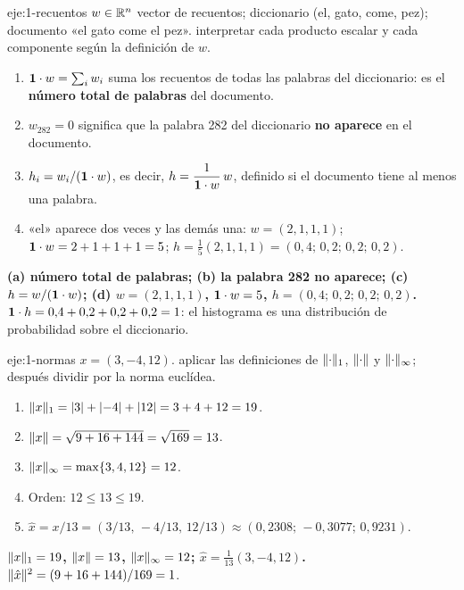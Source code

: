 \begin{solucion}{eje:1-recuentos}
\datos $w\in\mathbb{R}^{n}$ vector de recuentos; diccionario (el, gato, come, pez); documento «el gato come el pez».
\planteamiento interpretar cada producto escalar y cada componente según la definición de $w$.
\pasos
\begin{enumerate}[label=(\alph*)]
  \item $\mathbf{1}\cdot w=\sum_iw_i$ suma los recuentos de todas las palabras del diccionario: es el \textbf{número total de palabras} del documento.
  \item $w_{282}=0$ significa que la palabra 282 del diccionario \textbf{no aparece} en el documento.
  \item $h_i=w_i/(\mathbf{1}\cdot w)$, es decir, $h=\dfrac{1}{\mathbf{1}\cdot w}\,w$, definido si el documento tiene al menos una palabra.
  \item «el» aparece dos veces y las demás una: $w=(2,1,1,1)$; $\mathbf{1}\cdot w=2+1+1+1=5$; $h=\tfrac15(2,1,1,1)=(0{,}4;\,0{,}2;\,0{,}2;\,0{,}2)$.
\end{enumerate}
\resultado \textbf{(a) número total de palabras; (b) la palabra 282 no aparece; (c) $h=w/(\mathbf{1}\cdot w)$; (d) $w=(2,1,1,1)$, $\mathbf{1}\cdot w=5$, $h=(0{,}4;\,0{,}2;\,0{,}2;\,0{,}2)$.}
\comprobacion $\mathbf{1}\cdot h=0{,}4+0{,}2+0{,}2+0{,}2=1$: el histograma es una distribución de probabilidad sobre el diccionario.
\end{solucion}

\begin{solucion}{eje:1-normas}
\datos $x=(3,-4,12)$.
\planteamiento aplicar las definiciones de $\lVert\cdot\rVert_1$, $\lVert\cdot\rVert$ y $\lVert\cdot\rVert_\infty$; después dividir por la norma euclídea.
\pasos
\begin{enumerate}[label=\arabic*.]
  \item $\lVert x\rVert_1=\lvert3\rvert+\lvert-4\rvert+\lvert12\rvert=3+4+12=19$.
  \item $\lVert x\rVert=\sqrt{9+16+144}=\sqrt{169}=13$.
  \item $\lVert x\rVert_\infty=\max\{3,4,12\}=12$.
  \item Orden: $12\le 13\le 19$.
  \item $\hat x=x/13=(3/13,\,-4/13,\,12/13)\approx(0{,}2308;\,-0{,}3077;\,0{,}9231)$.
\end{enumerate}
\resultado \textbf{$\lVert x\rVert_1=19$, $\lVert x\rVert=13$, $\lVert x\rVert_\infty=12$; $\hat x=\frac{1}{13}(3,-4,12)$.}
\comprobacion $\lVert\hat x\rVert^{2}=(9+16+144)/169=1$.
\end{solucion}

